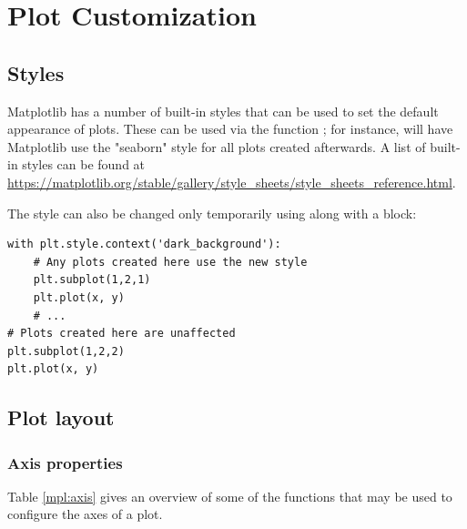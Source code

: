 \section*{Plot Customization} %

\subsection*{Styles}%
Matplotlib has a number of built-in styles that can be used to set the default appearance of plots.
These can be used via the function ; for instance,  will have Matplotlib use the "seaborn" style for all plots created afterwards.
A list of built-in styles can be found at \url{https://matplotlib.org/stable/gallery/style_sheets/style_sheets_reference.html}.

The style can also be changed only temporarily using  along with a  block:
\begin{lstlisting}
with plt.style.context('dark_background'):
    # Any plots created here use the new style
    plt.subplot(1,2,1)
    plt.plot(x, y)
    # ...
# Plots created here are unaffected
plt.subplot(1,2,2)
plt.plot(x, y)
\end{lstlisting}

\subsection*{Plot layout} %
\subsubsection*{Axis properties} %
Table \ref{mpl:axis} gives an overview of some of the functions that may be used to configure the axes of a plot.

